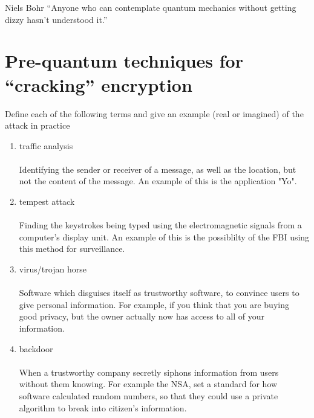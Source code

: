 \begin{chapquote}{Niels Bohr}
``Anyone who can contemplate quantum mechanics without getting dizzy hasn't understood it.''
\end{chapquote}
\section{Pre-quantum techniques for ``cracking'' encryption} Define each of the following terms and give an example (real or imagined) of the attack in practice
\begin{enumerate}
\item traffic analysis
\\
\\Identifying the sender or receiver of a message, as well as the location, but not the content of the message. An example of this is the application "Yo".
\vfill
\item tempest attack
\\
\\Finding the keystrokes being typed using the electromagnetic signals from a computer's display unit. An example of this is the possiblilty of the FBI using this method for surveillance.
\vfill
\item virus/trojan horse
\\
\\Software which disguises itself as trustworthy software, to convince users to give personal information. For example, if you think that you are buying good privacy, but the owner actually now has access to all of your information.
\item backdoor
\\
\\When a trustworthy company secretly siphons information from users without them knowing. For example the NSA, set a standard for how software calculated random numbers, so that they could use a private algorithm to break into citizen's information.
\end{enumerate}
\pagebreak
